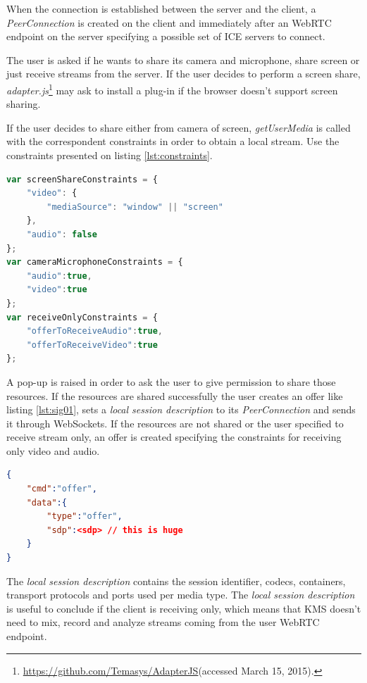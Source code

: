 When the connection is established between the server and the client, a \emph{PeerConnection} is created on the client and immediately after an \ac{WebRTC} endpoint on the server specifying a possible set of \ac{ICE} servers to connect.

The user is asked if he wants to share its camera and microphone, share screen or just receive streams from the server. If the user decides to perform a screen share, \emph{adapter.js}\footnote{\url{https://github.com/Temasys/AdapterJS}(accessed March 15, 2015).} may ask to install a plug-in if the browser doesn't support screen sharing.

If the user decides to share either from camera of screen, \emph{getUserMedia} is called with the correspondent constraints in order to obtain a local stream. Use the constraints presented on listing \ref{lst:constraints}. 

\begin{minipage}{\linewidth}
\begin{lstlisting}[caption={Media constraints},label={lst:constraints},language=JavaScript]
var screenShareConstraints = {	
	"video": {
		"mediaSource": "window" || "screen"
	}, 
	"audio": false
};
var cameraMicrophoneConstraints = {
	"audio":true, 
	"video":true 
};
var receiveOnlyConstraints = {
	"offerToReceiveAudio":true,
	"offerToReceiveVideo":true
};
\end{lstlisting}
\end{minipage}

A pop-up is raised in order to ask the user to give permission to share those resources. If the resources are shared successfully the user creates an offer like listing \ref{lst:sig01}, sets a \emph{local session description} to its \emph{PeerConnection} and sends it through WebSockets. If the resources are not shared or the user specified to receive stream only, an offer is created specifying the constraints for receiving only video and audio.

\begin{minipage}{\linewidth}
\begin{lstlisting}[caption={Offer created by client},label={lst:sig01},language=json]
{
	"cmd":"offer",
	"data":{
		"type":"offer",
		"sdp":<sdp>	// this is huge
	}
}
\end{lstlisting}
\end{minipage}

The \emph{local session description} contains the session identifier, codecs, containers, transport protocols and ports used per media type. The \emph{local session description} is useful to conclude if the client is receiving only, which means that \ac{KMS} doesn't need to mix, record and analyze streams coming from the user \ac{WebRTC} endpoint. 

